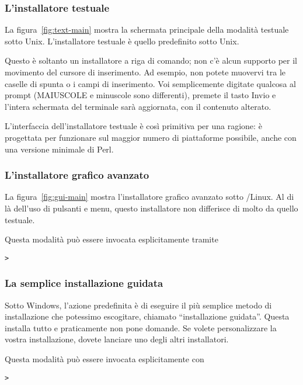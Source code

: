 \documentclass{article}
\begin{document}
\subsubsection{L'installatore testuale}

La figura~\ref{fig:text-main} mostra la schermata principale della
modalità testuale sotto Unix. L'installatore testuale è quello
predefinito sotto Unix.

Questo è soltanto un installatore a riga di comando; non c'è alcun
supporto per il movimento del cursore di inserimento. Ad esempio, non
potete muovervi tra le caselle di spunta o i campi di inserimento.
Voi semplicemente digitate qualcosa al prompt (MAIUSCOLE e minuscole sono
differenti), premete il tasto Invio e l'intera schermata del terminale
sarà aggiornata, con il contenuto alterato.

L'interfaccia dell'installatore testuale è così primitiva per una ragione:
è progettata per funzionare sul maggior numero di piattaforme possibile,
anche con una versione minimale di Perl.

\subsubsection{L'installatore grafico avanzato}

La figura~\ref{fig:gui-main} mostra l'installatore grafico avanzato sotto
\GNU/Linux. Al di là dell'uso di pulsanti e menu, questo installatore non
differisce di molto da quello testuale.

Questa modalità può essere invocata esplicitamente tramite
\begin{alltt}
> 
\end{alltt}


\subsubsection{La semplice installazione guidata}

Sotto Windows, l'azione predefinita è di eseguire il più semplice metodo
di installazione che potessimo escogitare, chiamato ``installazione
guidata''. Questa installa tutto e praticamente non pone domande. Se
volete personalizzare la vostra installazione, dovete lanciare uno degli
altri installatori.

Questa modalità può essere invocata esplicitamente con
\begin{alltt}
> 
\end{alltt}
\end{document}
